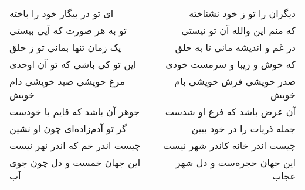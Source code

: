 \begin{center}
\begin{longtable}{l p{0.5cm} r}
ای تو در بیگار خود را باخته
&&
دیگران را تو ز خود نشناخته
\\
تو به هر صورت که آیی بیستی
&&
که منم این والله آن تو نیستی
\\
یک زمان تنها بمانی تو ز خلق
&&
در غم و اندیشه مانی تا به حلق
\\
این تو کی باشی که تو آن اوحدی
&&
که خوش و زیبا و سرمست خودی
\\
مرغ خویشی صید خویشی دام خویش
&&
صدر خویشی فرش خویشی بام خویش
\\
جوهر آن باشد که قایم با خودست
&&
آن عرض باشد که فرع او شدست
\\
گر تو آدم‌زاده‌ای چون او نشین
&&
جمله ذریات را در خود ببین
\\
چیست اندر خم که اندر نهر نیست
&&
چیست اندر خانه کاندر شهر نیست
\\
این جهان خمست و دل چون جوی آب
&&
این جهان حجره‌ست و دل شهر عجاب
\\
\end{longtable}
\end{center}
